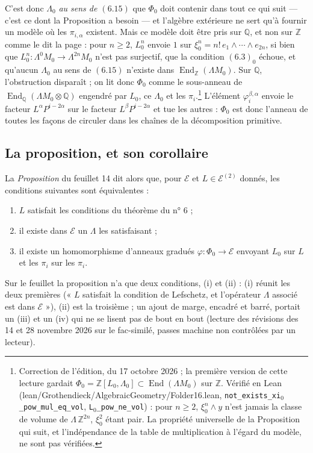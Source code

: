\documentclass[11pt,a4paper]{article}
\begin{document}
C'est donc $\Lambda_{0}$ \emph{au sens de $(6.15)$} que $\Phi_{0}$ doit
contenir dans tout ce qui suit --- c'est ce dont la Proposition a besoin --- et
l'algèbre extérieure ne sert qu'à fournir un modèle où les $\pi_{i,\alpha}$
existent. Mais ce modèle doit être pris sur $\mathbb{Q}$, et non sur
$\mathbb{Z}$ comme le dit la page : pour $n \geqslant 2$, $L_{0}^{n}$ envoie
$1$ sur $\xi_{0}^{n} = n!\, e_{1} \wedge \cdots \wedge e_{2n}$, si bien que
$L_{0}^{n} \colon \Lambda^{0}M_{0} \to \Lambda^{2n}M_{0}$ n'est pas surjectif,
que la condition $(6.3)_{0}$ échoue, et qu'aucun $\Lambda_{0}$ au sens de
$(6.15)$ n'existe dans $\operatorname{End}_{\mathbb{Z}}(\Lambda M_{0})$. Sur
$\mathbb{Q}$, l'obstruction disparaît ; on lit donc $\Phi_{0}$ comme le
sous-anneau de $\operatorname{End}_{\mathbb{Q}}(\Lambda M_{0} \otimes
\mathbb{Q})$ engendré par $L_{0}$, ce $\Lambda_{0}$ et les
$\pi_{i}$.\footnote{Correction de l'édition, du 17 octobre 2026 ; la première
version de cette lecture gardait $\Phi_{0} = \mathbb{Z}[L_{0}, \Lambda_{0}]
\subset \operatorname{End}(\Lambda M_{0})$ sur $\mathbb{Z}$. Vérifié en Lean
(lean/Grothendieck/AlgebraicGeometry/Folder16.lean, \texttt{not\_exists\_xi}$_{0}$\texttt{\_pow\_mul\_eq\_vol},
\texttt{L}$_{0}$\texttt{\_pow\_ne\_vol}) : pour $n \geqslant 2$, $\xi_{0}^{n} \wedge y$
n'est jamais la classe de volume de $\Lambda\,\mathbb{Z}^{2n}$, $\xi_{0}^{2}$
étant pair. La propriété universelle de la Proposition qui suit, et
l'indépendance de la table de multiplication à l'égard du modèle, ne sont pas
vérifiées.} L'élément
$\varphi^{\beta,\alpha}_{i}$ envoie le facteur $L^{\alpha}P^{i-2\alpha}$ sur le
facteur $L^{\beta}P^{i-2\alpha}$ et tue les autres : $\Phi_{0}$ est donc
l'anneau de toutes les façons de circuler dans les chaînes de la décomposition
primitive.

\subsection*{La proposition, et son corollaire}

La \emph{Proposition} du feuillet 14 dit alors que, pour $\mathcal{E}$ et
$L \in \mathcal{E}^{(2)}$ donnés, les conditions suivantes sont équivalentes :

\begin{enumerate}
  \item $L$ satisfait les conditions du théorème du n° 6 ;
  \item il existe dans $\mathcal{E}$ un $\Lambda$ les satisfaisant ;
  \item il existe un homomorphisme d'anneaux gradués
  $\varphi \colon \Phi_{0} \to \mathcal{E}$ envoyant $L_{0}$ sur $L$ et les
  $\pi_{i}$ sur les $\pi_{i}$.
\end{enumerate}
Sur le feuillet la proposition n'a que deux conditions, (i) et (ii) : (i)
réunit les deux premières (« $L$ satisfait la condition de Lefschetz, et
l'opérateur $\Lambda$ associé est dans $\mathcal{E}$ »), (ii) est la troisième ;
un ajout de marge, encadré et barré, portait un (iii) et un (iv) qui ne se
lisent pas de bout en bout (lecture des révisions des 14 et 28 novembre 2026
sur le fac-similé, passes machine non contrôlées par un lecteur).
\end{document}
